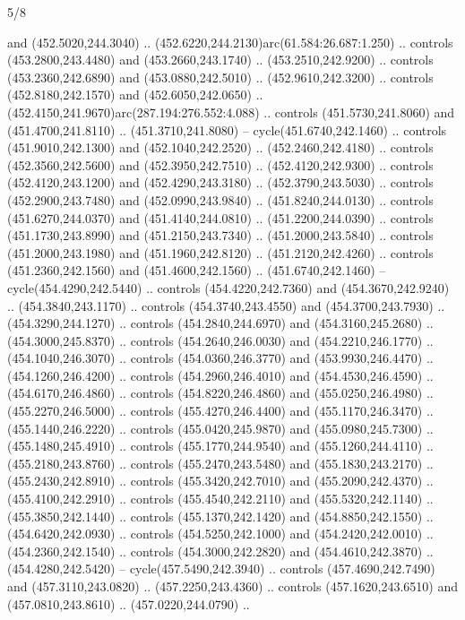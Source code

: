 \begin{flagdescription}{5/8}
\begin{scope}[xshift=0.5\flaglength,yshift=0.5\flagwidth,scale=\flagwidth/475.63]
\begin{scope}[y=0.8pt, x=0.8pt, yscale=-1, xscale=1,shift={(-450,-300)}]
\begin{scope}[cm={{1.0,0.0,0.0,1.0,(-0.0002,0.12556)}},cm={{1.0,0.0,0.0,1.0,(0.00179,0.0)}}]
\begin{scope}[cm={{1.00926,0.0,0.0,1.00926,(-3.1541,-2.47648)}}]
  and (452.5020,244.3040) .. (452.6220,244.2130)arc(61.584:26.687:1.250) ..
  controls (453.2800,243.4480) and (453.2660,243.1740) .. (453.2510,242.9200) ..
  controls (453.2360,242.6890) and (453.0880,242.5010) .. (452.9610,242.3200) ..
  controls (452.8180,242.1570) and (452.6050,242.0650) ..
  (452.4150,241.9670)arc(287.194:276.552:4.088) .. controls (451.5730,241.8060)
  and (451.4700,241.8110) .. (451.3710,241.8080) -- cycle(451.6740,242.1460) ..
  controls (451.9010,242.1300) and (452.1040,242.2520) .. (452.2460,242.4180) ..
  controls (452.3560,242.5600) and (452.3950,242.7510) .. (452.4120,242.9300) ..
  controls (452.4120,243.1200) and (452.4290,243.3180) .. (452.3790,243.5030) ..
  controls (452.2900,243.7480) and (452.0990,243.9840) .. (451.8240,244.0130) ..
  controls (451.6270,244.0370) and (451.4140,244.0810) .. (451.2200,244.0390) ..
  controls (451.1730,243.8990) and (451.2150,243.7340) .. (451.2000,243.5840) ..
  controls (451.2000,243.1980) and (451.1960,242.8120) .. (451.2120,242.4260) ..
  controls (451.2360,242.1560) and (451.4600,242.1560) .. (451.6740,242.1460) --
  cycle(454.4290,242.5440) .. controls (454.4220,242.7360) and
  (454.3670,242.9240) .. (454.3840,243.1170) .. controls (454.3740,243.4550) and
  (454.3700,243.7930) .. (454.3290,244.1270) .. controls (454.2840,244.6970) and
  (454.3160,245.2680) .. (454.3000,245.8370) .. controls (454.2640,246.0030) and
  (454.2210,246.1770) .. (454.1040,246.3070) .. controls (454.0360,246.3770) and
  (453.9930,246.4470) .. (454.1260,246.4200) .. controls (454.2960,246.4010) and
  (454.4530,246.4590) .. (454.6170,246.4860) .. controls (454.8220,246.4860) and
  (455.0250,246.4980) .. (455.2270,246.5000) .. controls (455.4270,246.4400) and
  (455.1170,246.3470) .. (455.1440,246.2220) .. controls (455.0420,245.9870) and
  (455.0980,245.7300) .. (455.1480,245.4910) .. controls (455.1770,244.9540) and
  (455.1260,244.4110) .. (455.2180,243.8760) .. controls (455.2470,243.5480) and
  (455.1830,243.2170) .. (455.2430,242.8910) .. controls (455.3420,242.7010) and
  (455.2090,242.4370) .. (455.4100,242.2910) .. controls (455.4540,242.2110) and
  (455.5320,242.1140) .. (455.3850,242.1440) .. controls (455.1370,242.1420) and
  (454.8850,242.1550) .. (454.6420,242.0930) .. controls (454.5250,242.1000) and
  (454.2420,242.0010) .. (454.2360,242.1540) .. controls (454.3000,242.2820) and
  (454.4610,242.3870) .. (454.4280,242.5420) -- cycle(457.5490,242.3940) ..
  controls (457.4690,242.7490) and (457.3110,243.0820) .. (457.2250,243.4360) ..
  controls (457.1620,243.6510) and (457.0810,243.8610) .. (457.0220,244.0790) ..

\end{scope}
\end{scope}
\end{scope}
\end{scope}
\end{flagdescription}
